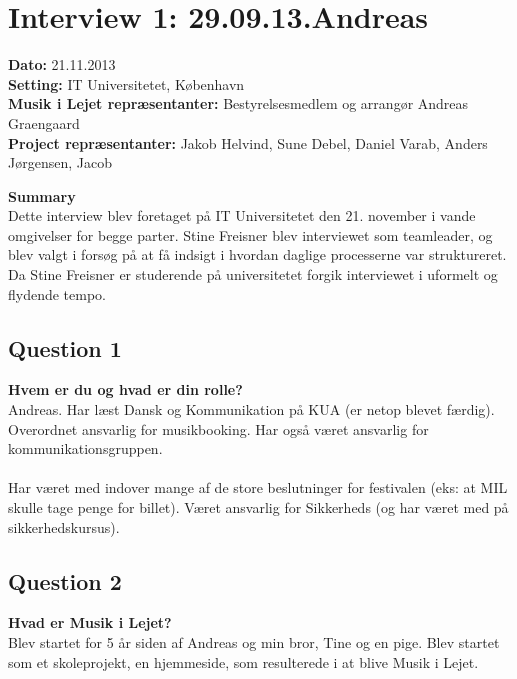 \section{Interview 1: 29.09.13.Andreas}
\label{interview_1}

\textbf{Dato:} 21.11.2013 \\
\textbf{Setting:} IT Universitetet, København \\
\textbf{Musik i Lejet repræsentanter:} Bestyrelsesmedlem og arrangør Andreas Graengaard  \\
\textbf{Project repræsentanter:} Jakob Helvind, Sune Debel, Daniel Varab, Anders Jørgensen, Jacob 

\bigskip

\noindent \textbf{Summary} \\
Dette interview blev foretaget på IT Universitetet den 21. november i vande omgivelser for begge parter. Stine Freisner blev interviewet som teamleader, og blev valgt i forsøg på at få indsigt i hvordan daglige processerne var struktureret. Da Stine Freisner er studerende på universitetet forgik interviewet i uformelt og flydende tempo.


\subsection{Question 1}
\label{i1q1}
\noindent \textbf{Hvem er du og hvad er din rolle?} \\
Andreas. Har læst Dansk og Kommunikation på KUA (er netop blevet færdig). Overordnet ansvarlig for musikbooking. Har også været ansvarlig for kommunikationsgruppen. 
\\ \\
Har været med indover mange af de store beslutninger for festivalen (eks: at MIL skulle tage penge for billet). Været ansvarlig for Sikkerheds (og har været med på sikkerhedskursus). 

\subsection{Question 2}
\label{i1q2}
\noindent \textbf{Hvad er Musik i Lejet?} \\
Blev startet for 5 år siden af Andreas og min bror, Tine og en pige. Blev startet som et skoleprojekt, en hjemmeside, som resulterede i at blive Musik i Lejet.

